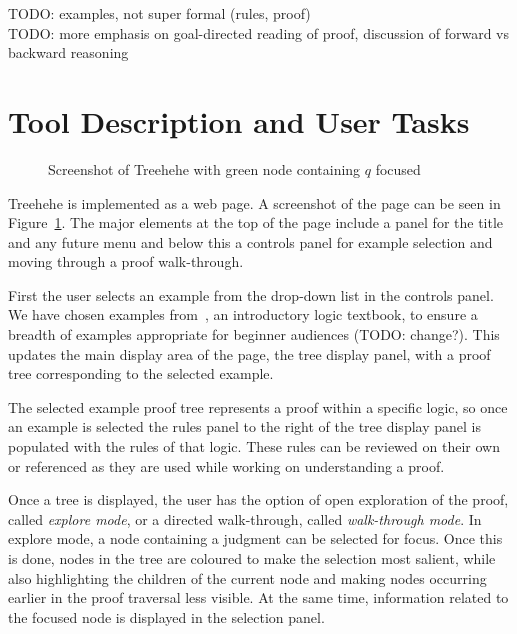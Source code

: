 \documentclass[conference]{IEEEtran}
\newcommand{\projectname}{Treehehe}
\begin{document}
TODO: examples, not super formal (rules, proof) \\

TODO: more emphasis on goal-directed reading of proof, discussion of forward vs backward reasoning \\


\section{Tool Description and User Tasks}
\label{sec:tooldesc}

\begin{figure}

\begin{center}
\end{center}

\caption{Screenshot of \projectname{} with green node containing $q$ focused}
\label{fig:screenshot}

\end{figure}

\projectname{} is implemented as a web page. A screenshot of the page can be seen in Figure~\ref{fig:screenshot}. The major elements at the top of the page include a panel for the title and any future menu and below this a controls panel for example selection and moving through a proof walk-through.

First the user selects an example from the drop-down list in the controls panel. We have chosen examples from~\cite{logicincs-huth+ryan}, an introductory logic textbook, to ensure a breadth of examples appropriate for beginner audiences (TODO: change?). This updates the main display area of the page, the tree display panel, with a proof tree corresponding to the selected example.

The selected example proof tree represents a proof within a specific logic, so once an example is selected the rules panel to the right of the tree display panel is populated with the rules of that logic. These rules can be reviewed on their own or referenced as they are used while working on understanding a proof.

Once a tree is displayed, the user has the option of open exploration of the proof, called \textit{explore mode}, or a directed walk-through, called \textit{walk-through mode}. In explore mode, a node containing a judgment can be selected for focus. Once this is done, nodes in the tree are coloured to make the selection most salient, while also highlighting the children of the current node and making nodes occurring earlier in the proof traversal less visible. At the same time, information related to the focused node is displayed in the selection panel.
\end{document}
